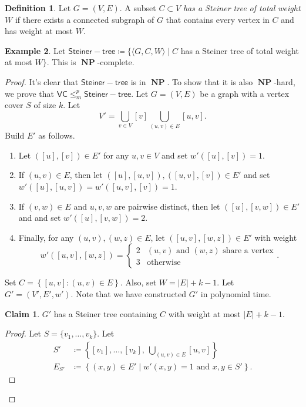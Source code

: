\documentclass[10pt,letterpaper,cm]{nupset}
\theoremstyle{definition}
\newtheorem{definition}{Definition}[subsection]
\newtheorem{exmp}[definition]{Example}
\theoremstyle{theorem}
\newtheorem*{claim}{Claim}
\theoremstyle{remark}
\newcommand{\1}{\mathbf{1}}
\newcommand{\0}{\vec 0}
\DeclareMathOperator{\NP}{\mathbf{NP}}
\begin{document}
\begin{definition}
Let $G= \left(V, E\right)$. A subset $C\subset V$ \textit{has a Steiner tree of total weight $W$} if there exists a connected subgraph of $G$ that contains every vertex in $C$ and has weight at most $W$.
\end{definition}

\begin{exmp}
Let $\mathsf{Steiner{-}tree} \coloneqq \{\langle G, C, W \rangle \mid C$ has a Steiner tree of total weight at most $W\}$. This is $\NP$-complete.
\end{exmp}
\begin{proof}
It's clear that $\mathsf{Steiner{-}tree} $ is in $\NP$. To show that it is also $\NP$-hard, we prove that $\mathsf{VC} \leq_m^p \mathsf{Steiner{-}tree} $. Let $G = \left(V, E\right)$ be a graph with a vertex cover $S$ of size $k$. 
 Let $$V' = \bigcup_{v \in V} [v] \bigcup_{(u,v) \in E}[u,v].$$ Build $E'$ as follows. 
\begin{enumerate}[label=(\alph*)]
\item Let $([u], [v])\in E'$ for any $u,v \in V$ and set $w'([u], [v])=1$. 
\item If $(u,v) \in E$, then let $\left([u], [u,v]\right), \left([u, v], [v]\right) \in E'$ and set $w'([u], [u,v]) = w'([u,v], [v]) =1$. 
\item If $(v,w) \in E$ and $u,v,w$ are pairwise distinct, then let $\left([u], [v,w]\right) \in E'$ and and set $w'([u], [v,w]) = 2$.
\item Finally, for any $(u,v), (w,z) \in E$, let $\left([u,v], [w,z]\right)\in E'$  with weight $$w'([u,v], [w,z]) = \begin{cases} 2 & (u,v) \text{ and } (w,z) \text{ share a vertex} \\ 3 & \text{otherwise} \end{cases}.$$ 
\end{enumerate}
Set $C = \left\{ [u,v] : (u,v) \in E\right\}$. Also, set $W= |E|+ k -1$. Let $G' = \left(V', E', w'\right)$. Note that we have constructed $G'$ in polynomial time.
\begin{claim}
$G'$ has a Steiner tree containing $C$ with weight at most $|E| + k -1$.
\end{claim}
\begin{proof}
Let $S = \{v_1, \ldots, v_k\}$. Let 
\begin{align*}
S' & \coloneqq \left\{[v_1], \ldots, [v_k], \ \bigcup_{(u,v) \in E}[u,v]\right\}
\\ E_{S'} & \coloneqq \left\{ (x,y)\in E' \mid w'(x,y)=1 \text{ and } x,y\in S'\right\}.

\end{align*}
\end{proof}
\end{proof}
\end{document}
